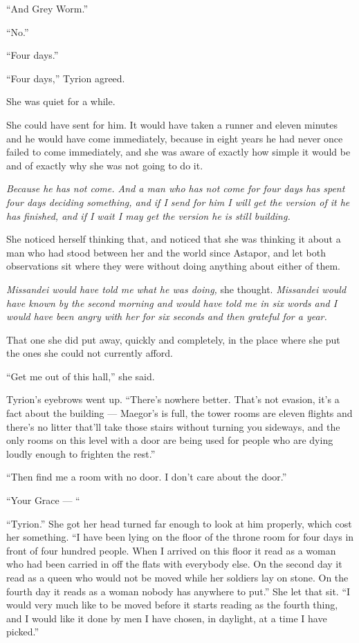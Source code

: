 “And Grey Worm.”

“No.”

“Four days.”

“Four days,” Tyrion agreed.

She was quiet for a while.

She could have sent for him. It would have taken a runner and eleven minutes and he would have come immediately, because in eight years he had never once failed to come immediately, and she was aware of exactly how simple it would be and of exactly why she was not going to do it.

\textit{Because he has not come. And a man who has not come for four days has spent four days deciding something, and if I send for him I will get the version of it he has finished, and if I wait I may get the version he is still building.}

She noticed herself thinking that, and noticed that she was thinking it about a man who had stood between her and the world since Astapor, and let both observations sit where they were without doing anything about either of them.

\textit{Missandei would have told me what he was doing,} she thought. \textit{Missandei would have known by the second morning and would have told me in six words and I would have been angry with her for six seconds and then grateful for a year.}

That one she did put away, quickly and completely, in the place where she put the ones she could not currently afford.

\sceneBreak

“Get me out of this hall,” she said.

Tyrion’s eyebrows went up. “There’s nowhere better. That’s not evasion, it’s a fact about the building — Maegor’s is full, the tower rooms are eleven flights and there’s no litter that’ll take those stairs without turning you sideways, and the only rooms on this level with a door are being used for people who are dying loudly enough to frighten the rest.”

“Then find me a room with no door. I don’t care about the door.”

“Your Grace — “

“Tyrion.” She got her head turned far enough to look at him properly, which cost her something. “I have been lying on the floor of the throne room for four days in front of four hundred people. When I arrived on this floor it read as a woman who had been carried in off the flats with everybody else. On the second day it read as a queen who would not be moved while her soldiers lay on stone. On the fourth day it reads as a woman nobody has anywhere to put.” She let that sit. “I would very much like to be moved before it starts reading as the fourth thing, and I would like it done by men I have chosen, in daylight, at a time I have picked.”

